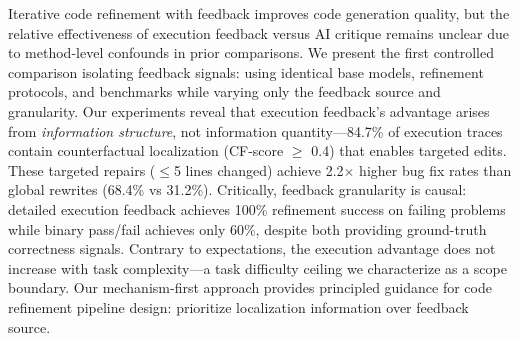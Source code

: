 Iterative code refinement with feedback improves code generation quality, but the relative effectiveness of execution feedback versus AI critique remains unclear due to method-level confounds in prior comparisons. We present the first controlled comparison isolating feedback signals: using identical base models, refinement protocols, and benchmarks while varying only the feedback source and granularity. Our experiments reveal that execution feedback's advantage arises from \emph{information structure}, not information quantity---84.7\% of execution traces contain counterfactual localization (CF-score $\geq$ 0.4) that enables targeted edits. These targeted repairs ($\leq$5 lines changed) achieve 2.2$\times$ higher bug fix rates than global rewrites (68.4\% vs 31.2\%). Critically, feedback granularity is causal: detailed execution feedback achieves 100\% refinement success on failing problems while binary pass/fail achieves only 60\%, despite both providing ground-truth correctness signals. Contrary to expectations, the execution advantage does not increase with task complexity---a task difficulty ceiling we characterize as a scope boundary. Our mechanism-first approach provides principled guidance for code refinement pipeline design: prioritize localization information over feedback source.
